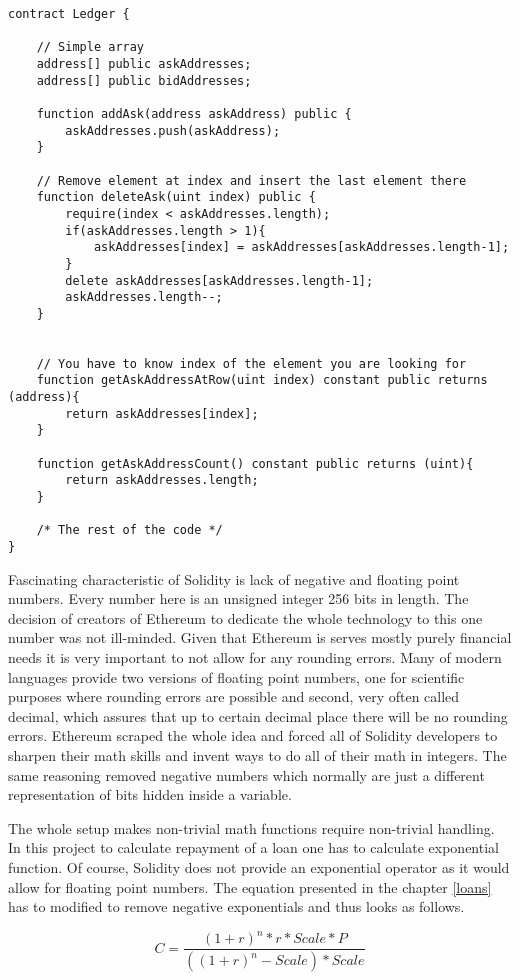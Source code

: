 \documentclass[a4paper,12pt,twoside,openany]{report}
\begin{document}
\begin{lstlisting}
contract Ledger {

 	// Simple array
	address[] public askAddresses;
	address[] public bidAddresses;

	function addAsk(address askAddress) public {
		askAddresses.push(askAddress);
	}

	// Remove element at index and insert the last element there
	function deleteAsk(uint index) public {
		require(index < askAddresses.length);
		if(askAddresses.length > 1){
			askAddresses[index] = askAddresses[askAddresses.length-1];
		}
		delete askAddresses[askAddresses.length-1];
		askAddresses.length--;
	}


	// You have to know index of the element you are looking for
	function getAskAddressAtRow(uint index) constant public returns (address){
		return askAddresses[index];
	}

	function getAskAddressCount() constant public returns (uint){
		return askAddresses.length;
	}

	/* The rest of the code */
}
\end{lstlisting}
 
Fascinating characteristic of Solidity is lack of negative and floating point numbers. Every number here is an unsigned integer 256 bits in length. The decision of creators of Ethereum to dedicate the whole technology to this one number was not ill-minded. Given that Ethereum is serves mostly purely financial needs it is very important to not allow for any rounding errors. Many of modern languages provide two versions of floating point numbers, one for scientific purposes where rounding errors are possible and second, very often called decimal, which assures that up to certain decimal place there will be no rounding errors. Ethereum scraped the whole idea and forced all of Solidity developers to sharpen their math skills and invent ways to do all of their math in integers. The same reasoning removed negative numbers which normally are just a different representation of bits hidden inside a variable.

The whole setup makes non-trivial math functions require non-trivial handling. In this project to calculate repayment of a loan one has to calculate exponential function. Of course, Solidity does not provide an exponential operator as it would allow for floating point numbers. The equation presented in the chapter \ref{loans} has to modified to remove negative exponentials and thus looks as follows.
	
\[C = \frac{(1+r)^n * r * Scale * P}{((1+r)^n - Scale) * Scale}	\]
\end{document}

